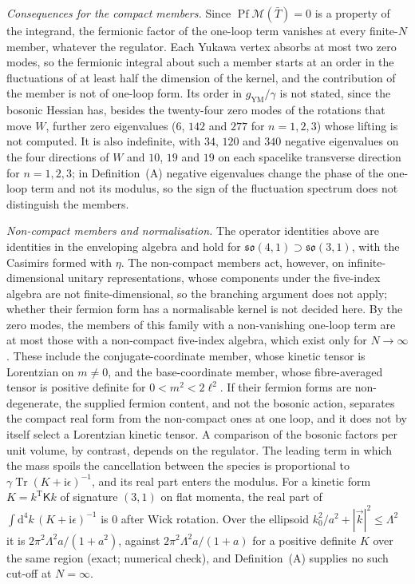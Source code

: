 \emph{Consequences for the compact members.} Since \(\operatorname{Pf}\mathcal M(\bar T)=0\) is a property of the integrand, the fermionic factor of the one-loop term vanishes at every finite-\(N\) member, whatever the regulator. Each Yukawa vertex absorbs at most two zero modes, so the fermionic integral about such a member starts at an order in the fluctuations of at least half the dimension of the kernel, and the contribution of the member is not of one-loop form. Its order in \(g_{\mathrm{YM}}/\gamma\) is not stated, since the bosonic Hessian has, besides the twenty-four zero modes of the rotations that move \(W\), further zero eigenvalues (\(6\), \(142\) and \(277\) for \(n=1,2,3\)) whose lifting is not computed. It is also indefinite, with \(34\), \(120\) and \(340\) negative eigenvalues on the four directions of \(W\) and \(10\), \(19\) and \(19\) on each spacelike transverse direction for \(n=1,2,3\); in Definition~(A) negative eigenvalues change the phase of the one-loop term and not its modulus, so the sign of the fluctuation spectrum does not distinguish the members.

\emph{Non-compact members and normalisation.} The operator identities above are identities in the enveloping algebra and hold for \(\mathfrak{so}(4,1)\supset\mathfrak{so}(3,1)\), with the Casimirs formed with \(\eta\). The non-compact members act, however, on infinite-dimensional unitary representations, whose components under the five-index algebra are not finite-dimensional, so the branching argument does not apply; whether their fermion form has a normalisable kernel is not decided here. By the zero modes, the members of this family with a non-vanishing one-loop term are at most those with a non-compact five-index algebra, which exist only for \(N\to\infty\). These include the conjugate-coordinate member, whose kinetic tensor is Lorentzian on \(m\neq0\), and the base-coordinate member, whose fibre-averaged tensor is positive definite for \(0<m^2<2\ell^2\). If their fermion forms are non-degenerate, the supplied fermion content, and not the bosonic action, separates the compact real form from the non-compact ones at one loop, and it does not by itself select a Lorentzian kinetic tensor. A comparison of the bosonic factors per unit volume, by contrast, depends on the regulator. The leading term in which the mass spoils the cancellation between the species is proportional to \(\gamma\operatorname{Tr}(K+\mathrm i\epsilon)^{-1}\), and its real part enters the modulus. For a kinetic form \(K=k^{\mathrm T}\mathsf Kk\) of signature \((3,1)\) on flat momenta, the real part of \(\int\mathrm d^4k\,(K+\mathrm i\epsilon)^{-1}\) is \(0\) after Wick rotation. Over the ellipsoid \(k_0^2/a^2+|\vec k|^2\le\Lambda^2\) it is \(2\pi^2\Lambda^2a/(1+a^2)\), against \(2\pi^2\Lambda^2a/(1+a)\) for a positive definite \(K\) over the same region (exact; numerical check), and Definition~(A) supplies no such cut-off at \(N=\infty\).

